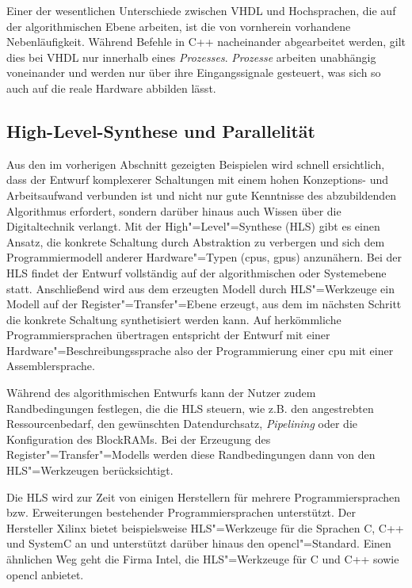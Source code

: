 Einer der wesentlichen Unterschiede zwischen VHDL und Hochsprachen, die auf
der algorithmischen Ebene arbeiten, ist die von vornherein vorhandene
Nebenläufigkeit. Während Befehle in C++ nacheinander abgearbeitet werden, gilt
dies bei VHDL nur innerhalb eines \textit{Prozesses}. \textit{Prozesse} arbeiten
unabhängig voneinander und werden nur über ihre Eingangssignale gesteuert, was
sich so auch auf die reale Hardware abbilden lässt. \cite[vgl.][25]{kesel2013}

\subsection{High-Level-Synthese und Parallelität}\label{fpga:entwicklung:hls}

Aus den im vorherigen Abschnitt gezeigten Beispielen wird schnell ersichtlich,
dass der Entwurf komplexerer Schaltungen mit einem hohen Konzeptions- und
Arbeitsaufwand verbunden ist und nicht nur gute Kenntnisse des  abzubildenden
Algorithmus erfordert, sondern darüber hinaus auch Wissen über die
Digitaltechnik verlangt. Mit der High"=Level"=Synthese (HLS) gibt es einen
Ansatz, die konkrete Schaltung durch Abstraktion zu verbergen und sich dem
Programmiermodell anderer Hardware"=Typen (\gls{cpu}s, \gls{gpu}s) anzunähern.
Bei der HLS findet der Entwurf vollständig auf der algorithmischen oder
Systemebene statt. Anschließend wird aus dem erzeugten Modell durch
HLS"=Werkzeuge ein Modell auf der Register"=Transfer"=Ebene erzeugt, aus dem im
nächsten Schritt die konkrete Schaltung synthetisiert werden kann. Auf
herkömmliche Programmiersprachen übertragen entspricht der Entwurf mit einer
Hardware"=Beschreibungssprache also der Programmierung einer \gls{cpu} mit einer
Assemblersprache.
\cite[vgl.][7]{hlsintro2019}

Während des algorithmischen Entwurfs kann der Nutzer zudem Randbedingungen
festlegen, die die HLS steuern, wie z.B. den angestrebten Ressourcenbedarf,
den gewünschten Datendurchsatz, \textit{Pipelining} oder die
Konfiguration des BlockRAMs. Bei der Erzeugung des Register"=Transfer"=Modells
werden diese Randbedingungen dann von den HLS"=Werkzeugen berücksichtigt.
\cite[vgl.][482]{kesel2013}

Die HLS wird zur Zeit von einigen Herstellern für mehrere Programmiersprachen
bzw. Erweiterungen bestehender Programmiersprachen unterstützt. Der Hersteller
Xilinx bietet beispielsweise HLS"=Werkzeuge für die Sprachen C, C++ und SystemC
an und unterstützt darüber hinaus den \gls{opencl}"=Standard. Einen ähnlichen
Weg geht die Firma Intel, die HLS"=Werkzeuge für C und C++ sowie \gls{opencl}
anbietet.

